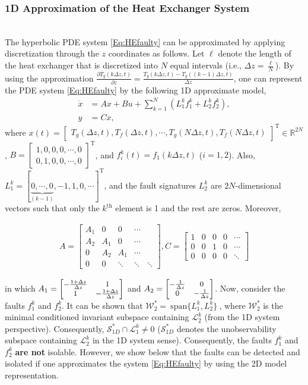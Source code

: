 \documentclass[journal,12pt,draftcls,onecolumn]{IEEEtran}
\newcommand{\tran}{\mathrm{T}}
\newcommand{\bbm}{\begin{bmatrix}}
\newcommand{\ebm}{\end{bmatrix}}
\newcommand{\bs}{\begin{small}}
\newcommand{\es}{\end{small}}
\newcommand{\ssp}[1]{\mathscr{#1}}      \newcommand{\setssp}[1]{\mathfrak{#1}}   \newcommand{\fld}[1]{\mathbb{#1}}       \newcommand{\op}[1]{\mathcal{#1}}       \newcommand{\sumbanach}[1]{\sum{#1}}
\newcommand{\spanset}[1]{\ \mathrm{span}\{#1\}\ } \newcommand{\idv}{{\bf x}_{-\infty}^\infty}				\newcommand{\fdv}{{\bf x}}
\newcommand{\pardiff}[2]{\frac{\partial {#1}}{\partial {#2}}}
\begin{document}
\subsubsection{1D Approximation of the Heat Exchanger System}\ \\
The hyperbolic PDE system \eqref{Eq:HEfaulty} can be approximated by applying discretization through the $z$ coordinates as follows. Let $\ell$ denote the length of the heat exchanger that is discretized  into $N$ equal intervals (i.e., $\Delta z = \frac{\ell}{N}$). By using the approximation $\pardiff{T_g(k\Delta z,t)}{z} = \frac{T_g(k\Delta z,t)-T_g((k-1)\Delta z, t)}{\Delta z}$, one can represent the PDE system \eqref{Eq:HEfaulty} by the following 1D approximate model,
\begin{equation}\label{Eq:1DApproximation}
\begin{split}
\dot{x} &= Ax+Bu+\sum_{k=1}^N (L_1^k f_1^k+L_2^kf_2^k),\\
y &= Cx,
\end{split}
\end{equation}
where $x(t) = \bbm T_g(\Delta z,t), T_f(\Delta z,t),\cdots,T_g(N\Delta z, t),T_f(N\Delta z, t)\ebm^\tran\in\fld{R}^{2N}$, $B = \bbm 1,0,0,0,\cdots,0\\0,1,0,0,\cdots,0\ebm^\tran$, and $f_i^k(t) = f_1(k\Delta z,t)$ ($i=1,2$). Also, $L_1^k = [\underbrace{0,\cdots,0}_{(k-1)},-1,1,0,\cdots]^\tran$, and the fault signatures $L_2^k$  are  $2N$-dimensional vectors such that only the $k^\mathrm{th}$ element is 1 and the rest are zeros. Moreover,
\bs
\begin{equation}\label{Eq:1DApproximation_par}
\begin{split}
A = \bbm A_1 &0 &0  &\cdots\\
A_2 &A_1 &0  &\cdots\\
0 &A_2 &A_1  &\cdots\\
0 &0 &\ddots &\ddots &\ddots\ebm, C = \bbm 1 &0 &0 & 0&\cdots\\
0 &0 &1 &0 &\cdots\\
0  &0 &0 &0 &\ddots\ebm
\end{split}
\end{equation}
\es
in which $\bs A_1 = \bbm -\frac{1+\Delta z}{\Delta z} &1\\1 &-\frac{1+\Delta z}{\Delta z}\ebm\es$ and $\bs A_2 = \bbm -\frac{1}{\Delta z} &0\\0 &-\frac{1}{\Delta z}\ebm\es$. Now, consider the faults $f_1^k$ and $f_2^k$. It can be shown that $\ssp{W}^*_{2}=\spanset{L_1^k,L_2^k}$, where $\ssp{W}^*_{2}$ is the minimal conditioned invariant subspace containing $\ssp{L}_2^k$ (from the 1D system perspective). Consequently, $\op{S}^*_{1D} \cap \ssp{L}_1^k\neq 0$ ($\op{S}^*_{1D}$ denotes the unobservability subspace containing $\ssp{L}_2^k$ in the 1D system sense). Consequently, the faults $f_1^k$ and $f_2^k$ {\bf are not} isolable. However,  we show below that the faults can be detected and isolated if one approximates the system \eqref{Eq:HEfaulty} by using the 2D model representation.
\end{document}

